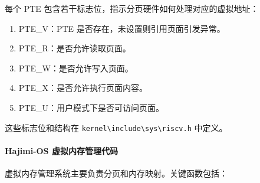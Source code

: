 \documentclass[UTF8]{article}
\begin{document}
每个 PTE 包含若干标志位，指示分页硬件如何处理对应的虚拟地址：
\begin{enumerate}[label=\textbf{\arabic*}., wide, labelwidth=!, labelindent=0pt]
  \item PTE\_V：PTE 是否存在，未设置则引用页面引发异常。
  \item PTE\_R：是否允许读取页面。
  \item PTE\_W：是否允许写入页面。
  \item PTE\_X：是否允许执行页面内容。
  \item PTE\_U：用户模式下是否可访问页面。
\end{enumerate}

这些标志位和结构在 \texttt{kernel\textbackslash include\textbackslash sys\textbackslash riscv.h} 中定义。

\paragraph{Hajimi-OS 虚拟内存管理代码\\}
虚拟内存管理系统主要负责分页和内存映射。关键函数包括：
\end{document}
